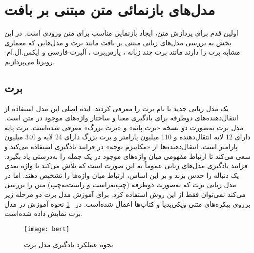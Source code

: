 
\section{مدل‌های بازنمائی متن مبتنی بر بافت}
\label{section.pretrained_models}
اولین قدم برای پردازش متن، ایجاد بازنمایی مناسب برای متن ورودی است. در این بخش به بررسی مدل‌های زبانی مبتنی بر بافت مانند برت \citep{devlin2018bert} و مدل‌هایی که معماری مشابه برت را دارند مانند برت چند زبانه ،
پارس‌برت  \citep{ParsBERT}،
آلبرت‌-فارسی  \citep{ALBERTPersian} و ایکس.ال.ام-روبرتا  \citep{conneau2019unsupervised} می‌پردازیم.

\subsection{برت}
\label{section.bert}
\citet{devlin2018bert} 
یک مدل زبانی جدید با نام برت را معرفی کردند. ایده اصلی این مدل استفاده از انتقال‌دهنده‌های‌ دوطرفه برای یادگیری معنا و ساختار واژه‌های موجود در متن است. مدل برت به‌صورت دو نسخه «برت پایه» و «برت بزرگ» معرفی شده‌است. برت پایه دارای 12 لایه انتقال‌دهنده و  110 میلیون پارامتر و برت بزرگ دارای  24 لایه و 340 میلیون پارامتر است. انتقال‌دهنده‌ها از «مکانیزم توجه» در فرایند یادگیری استفاده می‌کند و سعی می‌کند تا ارتباط مفهومی میان واژه‌های موجود در یک جمله را به‌درستی یاد بگیرد. فرایند یادگیری مدل‌های زبانی عموماً به این صورت است که تلاش می‌کند تا واژه بعدی یک دنباله را حدس بزند و بر این اساس، ارتباط میان واژه‌ها را تشخیص دهند. اما در مدل زبانی برت که به‌صورت دوطرفه (چپ‌به‌راست و راست‌به‌چپ) متن را بررسی می‌کند نمی‌توان فقط از این روش استفاده کرد. برای آموزش مدل برت دو مرحله زیر برروی پیکره‌های متنی ویکی‌پدیا و کتاب‌ها اعمال شده‌است. 
 در \figurename~\ref{fig.BERT} نحوه آموزش در مدل برت نمایش داده شده‌است.

\begin{figure}[!h]
\texttt{[image: bert]}
\centering
\caption{ نحوه عملکرد یادگیری مدل برت \citep{devlin2018bert}}
\label{fig.BERT}
\end{figure}

